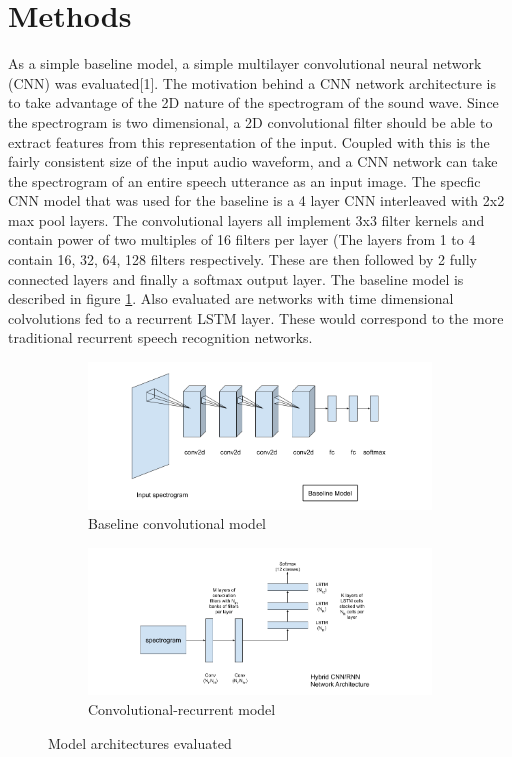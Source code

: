 \documentclass{article}
\begin{document}
\section{ Methods }
As a simple baseline model, a simple multilayer convolutional neural
network (CNN) was evaluated[1]. The motivation behind a CNN network
architecture is to take advantage of the 2D nature of the spectrogram
of the sound wave. Since the spectrogram is two dimensional, a 2D
convolutional filter should be able to extract features from this
representation of the input. Coupled with this is the fairly
consistent size of the input audio waveform, and a CNN network can
take the spectrogram of an entire speech utterance as an input
image. The specfic CNN model that was used for the baseline is a 4
layer CNN interleaved with 2x2 max pool layers\cite{oxerin-baseline}. The convolutional
layers all implement 3x3 filter kernels and contain power of two
multiples of 16 filters per layer (The layers from 1 to 4 contain
16, 32, 64, 128 filters respectively. These are then followed by 2
fully connected layers and finally a softmax output layer. The
baseline model is described in figure \ref{fig:baseline}. Also
evaluated are networks with time dimensional colvolutions fed to a
recurrent LSTM layer. These would correspond to the more traditional
recurrent speech recognition networks.
\begin{figure}
  \begin{subfigure}{.5\linewidth}
    \includegraphics[width=\linewidth]{images/baseline}
    \caption{Baseline convolutional model}
    \label{fig:baseline}
  \end{subfigure}%
  \begin{subfigure}{.5\linewidth}
    \includegraphics[width=\linewidth]{images/crnn}
    \caption{Convolutional-recurrent model}
    \label{fig:crnn}
  \end{subfigure}
  \caption{Model architectures evaluated}
\end{figure}
\end{document}
